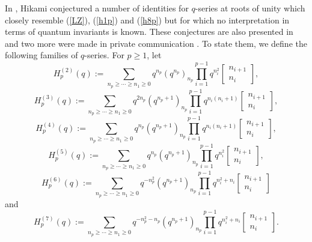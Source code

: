 \documentclass[11pt,reqno]{amsart}
\theoremstyle{definition}
\numberwithin{equation}{section}
\renewcommand{\=}{\;=\;}
\begin{document}
In \cite{hikami5}, Hikami conjectured a number of identities for $q$-series at roots of unity which closely resemble (\ref{LZ}), (\ref{h1p}) and (\ref{h8p}) but for which no interpretation in terms of quantum invariants is known. These conjectures are also presented in \cite{tm} and two more were made in private communication \cite{hikami6}.  To state them, we define the following families of $q$-series.   For $p \geq 1$, let
\begin{equation} \label{h2}
H_p^{(2)}(q) := \sum_{n_p \geq \cdots \geq n_1 \geq 0} q^{n_p} (q^{n_p})_{n_p} \prod_{i=1}^{p-1} q^{n_i^2} \begin{bmatrix}
n_{i+1} \\ n_i \end{bmatrix},
\end{equation}
\begin{equation} \label{h3}
H_p^{(3)}(q) := \sum_{n_p \geq \cdots \geq n_1 \geq 0} q^{2n_p} (q^{n_p + 1})_{n_p} \prod_{i=1}^{p-1} q^{n_i (n_i + 1)} \begin{bmatrix}
n_{i+1} \\ n_i \end{bmatrix},
\end{equation}
\begin{equation} \label{h4}
H_p^{(4)}(q) := \sum_{n_p \geq \cdots \geq n_1 \geq 0} q^{n_p} (q^{n_p + 1})_{n_p} \prod_{i=1}^{p-1} q^{n_i (n_i + 1)} \begin{bmatrix}
n_{i+1} \\ n_i \end{bmatrix},
\end{equation}
\begin{equation} \label{h5}
H_p^{(5)}(q) := \sum_{n_p \geq \cdots \geq n_1 \geq 0} q^{n_p} (q^{n_p + 1})_{n_p} \prod_{i=1}^{p-1} q^{n_i^2} \begin{bmatrix}
n_{i+1} \\ n_i \end{bmatrix},
\end{equation}
\begin{equation} \label{h6}
H_p^{(6)}(q) := \sum_{n_p \geq \cdots \geq n_1 \geq 0} q^{-n_p^2}(q^{n_p+1})_{n_p} \prod_{i=1}^{p-1} q^{n_i^2+n_i}\begin{bmatrix} n_{i+1} \\ n_i \end{bmatrix}
\end{equation}
and
\begin{equation} \label{h7}
H_p^{(7)}(q) := \sum_{n_p \geq \cdots \geq n_1 \geq 0} q^{-n_p^2-n_p}(q^{n_p+1})_{n_p} \prod_{i=1}^{p-1} q^{n_i^2+n_i}\begin{bmatrix} n_{i+1} \\ n_i \end{bmatrix}. 
\end{equation}
\end{document}
